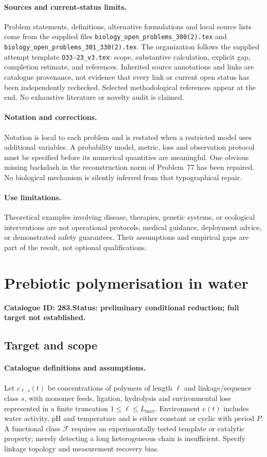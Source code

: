 \documentclass[11pt]{article}
\begin{document}
\paragraph{Sources and current-status limits.}
Problem statements, definitions, alternative formulations and local source lists
come from the supplied files
\texttt{biology\_open\_problems\_300(2).tex} and
\texttt{biology\_open\_problems\_301\_330(2).tex}.
The organization follows the supplied attempt template
\texttt{O33-23\_v3.tex}: scope, substantive calculation, explicit gap,
completion estimate, and references. Inherited source annotations and links are
catalogue provenance, not evidence that every link or current open status has
been independently rechecked. Selected methodological references appear at the
end. No exhaustive literature or novelty audit is claimed.

\paragraph{Notation and corrections.}
Notation is local to each problem and is restated when a restricted model uses
additional variables. A probability model, metric, loss and observation protocol
must be specified before its numerical quantities are meaningful. One obvious
missing backslash in the reconstruction norm of Problem~77 has been repaired.
No biological mechanism is silently inferred from that typographical repair.

\paragraph{Use limitations.}
Theoretical examples involving disease, therapies, genetic systems, or ecological
interventions are not operational protocols, medical guidance, deployment advice,
or demonstrated safety guarantees. Their assumptions and empirical gaps are part
of the result, not optional qualifications.

\setcounter{section}{282}
\section{Prebiotic polymerisation in water}
\label{prob:283}
\noindent\textbf{Catalogue ID: 283.}\quad \textbf{Status: preliminary conditional reduction; full target not established.}
\subsection{Target and scope}
\paragraph{Catalogue definitions and assumptions.}
Let $c_{\ell,s}(t)$ be concentrations of polymers of length $\ell$ and linkage/sequence class $s$, with monomer feeds, ligation, hydrolysis and environmental loss represented in a finite truncation $1\leq\ell\leq L_{\max}$. Environment $e(t)$ includes water activity, pH and temperature and is either constant or cyclic with period $P$. A functional class $\mathcal F$ requires an experimentally tested template or catalytic property; merely detecting a long heterogeneous chain is insufficient. Specify linkage topology and measurement recovery bias.
\end{document}
